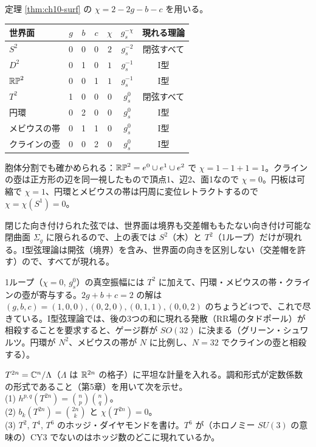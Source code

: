\begin{solution}
定理 \ref{thm:ch10-surf} の $\chi=2-2g-b-c$ を用いる。
\begin{center}
\begin{tabular}{lcccccc}
世界面 & $g$ & $b$ & $c$ & $\chi$ & $g_s^{-\chi}$ & 現れる理論\\ \hline
$S^2$ & 0&0&0& $2$ & $g_s^{-2}$ & 閉弦すべて\\
$D^2$ & 0&1&0& $1$ & $g_s^{-1}$ & I型\\
$\mathbb{RP}^2$ & 0&0&1& $1$ & $g_s^{-1}$ & I型\\
$T^2$ & 1&0&0& $0$ & $g_s^{0}$ & 閉弦すべて\\
円環 & 0&2&0& $0$ & $g_s^{0}$ & I型\\
メビウスの帯 & 0&1&1& $0$ & $g_s^{0}$ & I型\\
クラインの壺 & 0&0&2& $0$ & $g_s^{0}$ & I型
\end{tabular}
\end{center}
胞体分割でも確かめられる：$\mathbb{RP}^2=e^0\cup e^1\cup e^2$ で $\chi=1-1+1=1$。クラインの壺は正方形の辺を同一視したもので頂点1、辺2、面1なので $\chi=0$。円板は可縮で $\chi=1$、円環とメビウスの帯は円周に変位レトラクトするので $\chi=\chi(S^1)=0$。

閉じた向き付けられた弦では、世界面は境界も交差帽ももたない向き付け可能な閉曲面 $\Sigma_g$ に限られるので、上の表では $S^2$（木）と $T^2$（1ループ）だけが現れる。I型弦理論は開弦（境界）を含み、世界面の向きを区別しない（交差帽を許す）ので、すべてが現れる。

1ループ（$\chi=0$, $g_s^0$）の真空振幅には $T^2$ に加えて、円環・メビウスの帯・クラインの壺が寄与する。$2g+b+c=2$ の解は $(g,b,c)=(1,0,0),(0,2,0),(0,1,1),(0,0,2)$ のちょうど4つで、これで尽きている。I型弦理論では、後の3つの和に現れる発散（RR場のタドポール）が相殺することを要求すると、ゲージ群が $SO(32)$ に決まる（グリーン・シュワルツ。円環が $N^2$、メビウスの帯が $N$ に比例し、$N=32$ でクラインの壺と相殺する）。
\end{solution}

\begin{problem}[難易度 A]\label{ch10-prob-torus}
$T^{2n}=\mathbb{C}^n/\Lambda$（$\Lambda$ は $\mathbb{R}^{2n}$ の格子）に平坦な計量を入れる。調和形式が定数係数の形式であること（第5章）を用いて次を示せ。\\
(1) $h^{p,q}(T^{2n})=\binom np\binom nq$。\\
(2) $b_k(T^{2n})=\binom{2n}{k}$ と $\chi(T^{2n})=0$。\\
(3) $T^2$, $T^4$, $T^6$ のホッジ・ダイヤモンドを書け。$T^6$ が（ホロノミー $SU(3)$ の意味の）CY3 でないのはホッジ数のどこに現れているか。
\end{problem}

